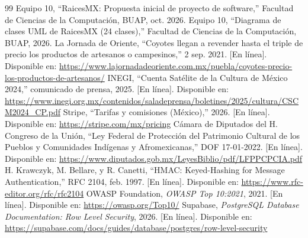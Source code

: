 \documentclass[conference,letterpaper,onecolumn]{IEEEtran}
\begin{document}
\begin{thebibliography}{99}
\sloppy
{} Equipo 10, ``RaicesMX: Propuesta inicial de proyecto de software,'' Facultad de Ciencias de la Computación, BUAP, oct. 2026.
 Equipo 10, ``Diagrama de clases UML de RaicesMX (24 clases),'' Facultad de Ciencias de la Computación, BUAP, 2026.
 La Jornada de Oriente, ``Coyotes llegan a revender hasta el triple de precio los productos de artesanos o campesinos,'' 2 sep. 2021. [En línea]. Disponible en: \url{https://www.lajornadadeoriente.com.mx/puebla/coyotes-precio-los-productos-de-artesanos/}
 INEGI, ``Cuenta Satélite de la Cultura de México 2024,'' comunicado de prensa, 2025. [En línea]. Disponible en: \url{https://www.inegi.org.mx/contenidos/saladeprensa/boletines/2025/cultura/CSCM2024_CP.pdf}
 Stripe, ``Tarifas y comisiones (México),'' 2026. [En línea]. Disponible en: \url{https://stripe.com/mx/pricing}
 Cámara de Diputados del H. Congreso de la Unión, ``Ley Federal de Protección del Patrimonio Cultural de los Pueblos y Comunidades Indígenas y Afromexicanas,'' DOF 17-01-2022. [En línea]. Disponible en: \url{https://www.diputados.gob.mx/LeyesBiblio/pdf/LFPPCPCIA.pdf}
 H. Krawczyk, M. Bellare, y R. Canetti, ``HMAC: Keyed-Hashing for Message Authentication,'' RFC 2104, feb. 1997. [En línea]. Disponible en: \url{https://www.rfc-editor.org/rfc/rfc2104}
 OWASP Foundation, \textit{OWASP Top 10:2021}, 2021. [En línea]. Disponible en: \url{https://owasp.org/Top10/}
 Supabase, \textit{PostgreSQL Database Documentation: Row Level Security}, 2026. [En línea]. Disponible en: \url{https://supabase.com/docs/guides/database/postgres/row-level-security}
\end{thebibliography}
\end{document}
